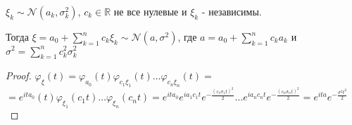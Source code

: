 \begin{theorem}
    $\xi_k \sim \mathcal{N} (a_k, \sigma_k^2)$, $c_k \in \mathbb{R}$ не все нулевые и $\xi_k$ - независимы.

    Тогда $\xi = a_0 + \sum_{k = 1}^n c_k \xi_k  \sim \mathcal{N} (a, \sigma^2)$, где
    $a = a_0 + \sum_{k = 1}^n c_k a_k$ и $\sigma^2 = \sum_{k = 1}^n c_k^2 \sigma_k^2$
\end{theorem}

\begin{proof}
    $\varphi_{\xi} (t) = \varphi_{a_0} (t) \varphi_{c_1\xi_1} (t) \ldots \varphi_{c_n\xi_n} (t) = $
    $=  e^{ita_0} (t) \varphi_{\xi_1} (c_1t) \ldots \varphi_{\xi_n} (c_nt) = 
    e^{ita_0} e^{ia_1c_1 t} e^{- \frac{(c_1 \sigma_1 t)^2}{2}} \ldots e^{ia_nc_n t} e^{- \frac{(c_n \sigma_n t)^2}{2}} =
    e^{ita} e^{- \frac{\sigma^2t^2}{2}} $
\end{proof}